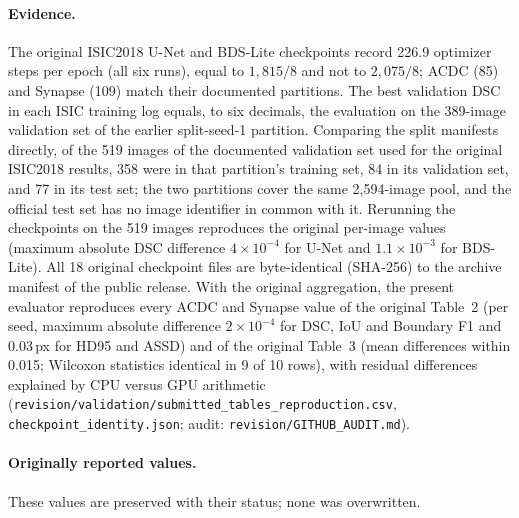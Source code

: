 \documentclass[10pt]{article}
\begin{document}
\paragraph{Evidence.} The original ISIC2018 U-Net and BDS-Lite checkpoints record 226.9 optimizer steps per epoch (all six runs), equal to $1{,}815/8$ and not to $2{,}075/8$; ACDC (85) and Synapse (109) match their documented partitions. The best validation DSC in each ISIC training log equals, to six decimals, the evaluation on the 389-image validation set of the earlier split-seed-1 partition. Comparing the split manifests directly, of the 519 images of the documented validation set used for the original ISIC2018 results, 358 were in that partition's training set, 84 in its validation set, and 77 in its test set; the two partitions cover the same 2,594-image pool, and the official test set has no image identifier in common with it. Rerunning the checkpoints on the 519 images reproduces the original per-image values (maximum absolute DSC difference $4\times10^{-4}$ for U-Net and $1.1\times10^{-3}$ for BDS-Lite). All 18 original checkpoint files are byte-identical (SHA-256) to the archive manifest of the public release. With the original aggregation, the present evaluator reproduces every ACDC and Synapse value of the original Table~2 (per seed, maximum absolute difference $2\times10^{-4}$ for DSC, IoU and Boundary F1 and 0.03\,px for HD95 and ASSD) and of the original Table~3 (mean differences within 0.015; Wilcoxon statistics identical in 9 of 10 rows), with residual differences explained by CPU versus GPU arithmetic (\texttt{revision/validation/submitted\_tables\_reproduction.csv}, \texttt{checkpoint\_identity.json}; audit: \texttt{revision/GITHUB\_AUDIT.md}).

\paragraph{Originally reported values.} These values are preserved with their status; none was overwritten.
\begin{table}[ht]\centering
\resizebox{\linewidth}{!}{}
\caption{Originally submitted Table~2 (three-seed means; ISIC2018 on the 519-image set; original aggregation, in which classes absent from both prediction and reference count as perfect). Source: public release \texttt{results/main\_test\_means.csv} and \texttt{results/matched\_gsl\_summary.csv}.}
\end{table}
\end{document}
